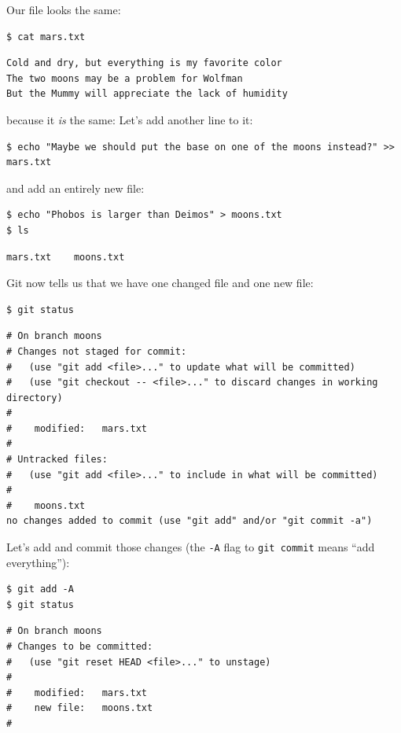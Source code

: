 \documentclass{book}
\begin{document}
Our file looks the same:

\begin{verbatim}
$ cat mars.txt
\end{verbatim}

\begin{verbatim}
Cold and dry, but everything is my favorite color
The two moons may be a problem for Wolfman
But the Mummy will appreciate the lack of humidity
\end{verbatim}

because it \emph{is} the same: Let's add another line to it:

\begin{verbatim}
$ echo "Maybe we should put the base on one of the moons instead?" >> mars.txt
\end{verbatim}

and add an entirely new file:

\begin{verbatim}
$ echo "Phobos is larger than Deimos" > moons.txt
$ ls
\end{verbatim}

\begin{verbatim}
mars.txt    moons.txt
\end{verbatim}

Git now tells us that we have one changed file and one new file:

\begin{verbatim}
$ git status
\end{verbatim}

\begin{verbatim}
# On branch moons
# Changes not staged for commit:
#   (use "git add <file>..." to update what will be committed)
#   (use "git checkout -- <file>..." to discard changes in working directory)
#
#    modified:   mars.txt
#
# Untracked files:
#   (use "git add <file>..." to include in what will be committed)
#
#    moons.txt
no changes added to commit (use "git add" and/or "git commit -a")
\end{verbatim}

Let's add and commit those changes (the \texttt{-A} flag to
\texttt{git commit} means ``add everything''):

\begin{verbatim}
$ git add -A
$ git status
\end{verbatim}

\begin{verbatim}
# On branch moons
# Changes to be committed:
#   (use "git reset HEAD <file>..." to unstage)
#
#    modified:   mars.txt
#    new file:   moons.txt
#
\end{verbatim}
\end{document}
